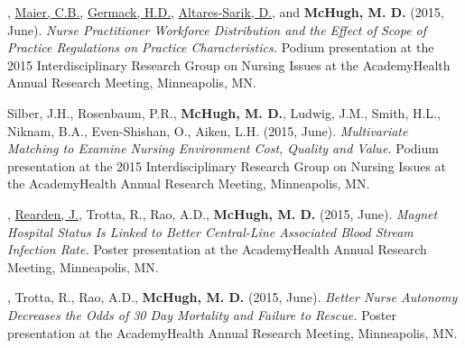 \documentclass[10pt,]{article}
\begin{document}
{{{{{{{{{{{{{{{\begin{hangparas}{.25in}{1}

, {\underline {Maier, C.B.}}, {\underline {Germack, H.D.}}, {\underline {Altares-Sarik, D.}}, and {\textbf {McHugh, M. D.}} (2015, June). {\textit {Nurse Practitioner Workforce Distribution and the Effect of Scope of Practice Regulations on Practice Characteristics.}} Podium presentation at the 2015 Interdisciplinary Research Group on Nursing Issues at the AcademyHealth Annual Research Meeting, Minneapolis, MN.

\end{hangparas}

\vspace{4mm}

\begin{hangparas}{.25in}{1}

\*Silber, J.H., Rosenbaum, P.R., {\textbf {McHugh, M. D.}}, Ludwig, J.M., Smith, H.L., Niknam, B.A., Even-Shishan, O., Aiken, L.H. (2015, June). {\textit {Multivariate Matching to Examine Nursing Environment Cost, Quality and Value.}} Podium presentation at the 2015 Interdisciplinary Research Group on Nursing Issues at the AcademyHealth Annual Research Meeting, Minneapolis, MN.

\end{hangparas}

\vspace{4mm}

\begin{hangparas}{.25in}{1}

, {\underline {Rearden, J.}}, Trotta, R., Rao, A.D., {\textbf {McHugh, M. D.}} (2015, June). {\textit {Magnet Hospital Status Is Linked to Better Central-Line Associated Blood Stream Infection Rate.}} Poster presentation at the AcademyHealth Annual Research Meeting, Minneapolis, MN.

\end{hangparas}

\vspace{4mm}

\begin{hangparas}{.25in}{1}

, Trotta, R., Rao, A.D., {\textbf {McHugh, M. D.}} (2015, June). {\textit {Better Nurse Autonomy Decreases the Odds of 30 Day Mortality and Failure to Rescue.}} Poster presentation at the AcademyHealth Annual Research Meeting, Minneapolis, MN.

\end{hangparas}

}}}}}}}}}}}}}}}
\end{document}

